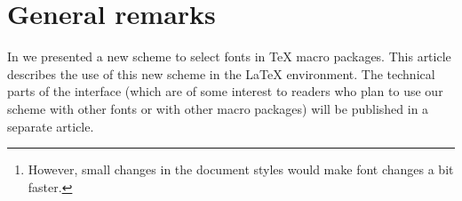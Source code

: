  \author{Frank Mittelbach \and
         Rainer Sch\"opf}%







\ifx\selectfont\undefined\else
{}\fontsize{10}{13pt}\selectfont
\fi



 \maketitle


 \tableofcontents

 \begin{abstract}
   In this article we describe the use of the new font selection scheme
   in the standard \LaTeX{} environment.
   The main characteristics are:
   \begin{itemize}
      \item
        The possibility to change family, series, shape and sizes
        independently of one another.
      \item
        The existence of a style file to process older documents
        without any changes to their layout and their input files.
      \item
	A macro setup which is consistent with existing standard
        document styles.\footnote{However, small changes in the document
                                  styles would make font changes a bit
                                  faster.}
   \end{itemize}
   It is planned to incorporate this font selection scheme into
   \LaTeX{} version 2.10.
 \end{abstract}

 \section{General remarks}

 In  we presented a new scheme to select fonts in \TeX{}
 macro packages.  This article describes the use of this new scheme in
 the \LaTeX{} environment.  The technical parts of the interface (which
 are of some interest to readers who plan to use our scheme with
 other fonts or with other macro packages) will be published in a
 separate article.

